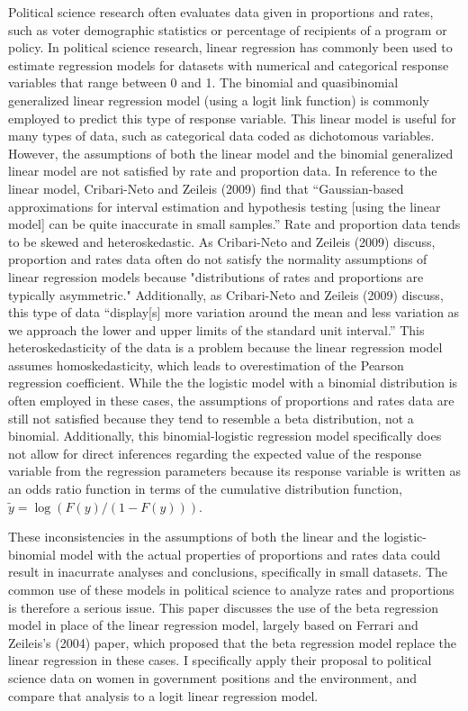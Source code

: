 \documentclass{svproc}
\begin{document}
Political science research often evaluates data given in proportions and rates, such as voter demographic statistics or percentage of recipients of a program or policy. In political science research, linear regression has commonly been used to estimate regression models for datasets with numerical and categorical response variables that range between 0 and 1. The binomial and quasibinomial generalized linear regression model (using a logit link function) is commonly employed to predict this type of response variable. This linear model is useful for many types of data, such as categorical data coded as dichotomous variables. However, the assumptions of both the linear model and the binomial generalized linear model are not satisfied by rate and proportion data. In reference to the linear model, Cribari-Neto and Zeileis (2009) find that \enquote{Gaussian-based approximations for interval estimation and hypothesis testing [using the linear model] can be quite inaccurate in small samples.} Rate and proportion data tends to be skewed and heteroskedastic. As Cribari-Neto and Zeileis (2009) discuss, proportion and rates data often do not satisfy the normality assumptions of linear regression models because "distributions of rates and proportions are typically asymmetric." Additionally, as Cribari-Neto and Zeileis (2009) discuss, this type of data \enquote{display[s] more variation around the mean and less variation as we approach the lower and upper limits of the standard unit interval.} This heteroskedasticity of the data is a problem because the linear regression model assumes homoskedasticity, which leads to overestimation of the Pearson regression coefficient. While the the logistic model with a binomial distribution is often employed in these cases, the assumptions of proportions and rates data are still not satisfied because they tend to resemble a beta distribution, not a binomial. Additionally, this binomial-logistic regression model specifically does not allow for direct inferences regarding the expected value of the response variable from the regression parameters because its response variable is written as an odds ratio function in terms of the cumulative distribution function, $\tilde{y} = \log(F(y)/(1-F(y)))$. 

These inconsistencies in the assumptions of both the linear and the logistic-binomial model with the actual properties of proportions and rates data could result in inacurrate analyses and conclusions, specifically in small datasets. The common use of these models in political science to analyze rates and proportions is therefore a serious issue. This paper discusses the use of the beta regression model in place of the linear regression model, largely based on Ferrari and Zeileis's (2004) paper, which proposed that the beta regression model replace the linear regression in these cases. I specifically apply their proposal to political science data on women in government positions and the environment, and compare that analysis to a logit linear regression model. 
\end{document}
